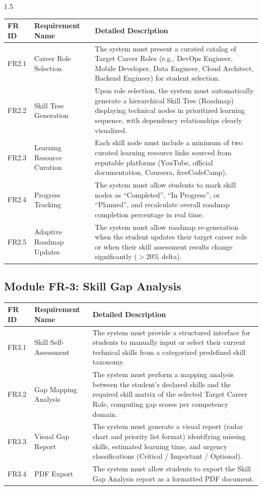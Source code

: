 \documentclass[12pt,a4paper]{report}
\begin{document}
\begin{spacing}{1.5}
		\begin{longtable}{|p{2cm}|p{4cm}|p{9cm}|}
			\hline
			\rowcolor{mainblue!15}\textbf{FR ID} & \textbf{Requirement Name} & \textbf{Detailed Description} \\ \hline
			FR2.1 & Career Role Selection & The system must present a curated catalog of Target Career Roles (e.g., DevOps Engineer, Mobile Developer, Data Engineer, Cloud Architect, Backend Engineer) for student selection. \\ \hline
			FR2.2 & Skill Tree Generation & Upon role selection, the system must automatically generate a hierarchical Skill Tree (Roadmap) displaying technical nodes in prioritized learning sequence, with dependency relationships clearly visualized. \\ \hline
			FR2.3 & Learning Resource Curation & Each skill node must include a minimum of two curated learning resource links sourced from reputable platforms (YouTube, official documentation, Coursera, freeCodeCamp). \\ \hline
			FR2.4 & Progress Tracking & The system must allow students to mark skill nodes as ``Completed'', ``In Progress'', or ``Planned'', and recalculate overall roadmap completion percentage in real time. \\ \hline
			FR2.5 & Adaptive Roadmap Updates & The system must allow roadmap re-generation when the student updates their target career role or when their skill assessment results change significantly ($>$20\% delta). \\ \hline
		\end{longtable}
		
		\subsection{Module FR-3: Skill Gap Analysis}
		
		\begin{longtable}{|p{2cm}|p{4cm}|p{9cm}|}
			\hline
			\rowcolor{mainblue!15}\textbf{FR ID} & \textbf{Requirement Name} & \textbf{Detailed Description} \\ \hline
			FR3.1 & Skill Self-Assessment & The system must provide a structured interface for students to manually input or select their current technical skills from a categorized predefined skill taxonomy. \\ \hline
			FR3.2 & Gap Mapping Analysis & The system must perform a mapping analysis between the student's declared skills and the required skill matrix of the selected Target Career Role, computing gap scores per competency domain. \\ \hline
			FR3.3 & Visual Gap Report & The system must generate a visual report (radar chart and priority list format) identifying missing skills, estimated learning time, and urgency classifications (Critical / Important / Optional). \\ \hline
			FR3.4 & PDF Export & The system must allow students to export the Skill Gap Analysis report as a formatted PDF document. \\ \hline
		\end{longtable}
		

\end{spacing}
\end{document}
